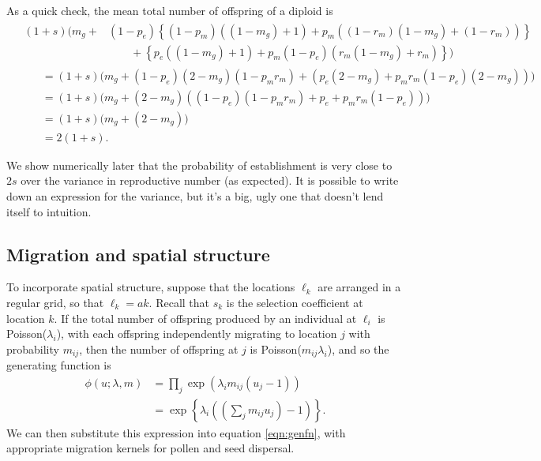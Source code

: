 As a quick check,
the mean total number of offspring of a diploid is
\begin{align}
  & \begin{aligned}
(1+s) \big(
    m_g
    + & (1-p_e)\left\{ (1-p_m) ( (1-m_g) + 1 ) + p_m ( (1-r_m)(1-m_g) + (1-r_m) ) \right\} \\
    & \qquad + \left\{ p_e ( (1-m_g) + 1 ) + p_m (1-p_e)( r_m(1-m_g) + r_m ) \right\} 
    \big) 
  \end{aligned}  \\
& \qquad = 
    (1+s) \big( m_g + 
      (1-p_e)(2-m_g)(1 - p_m r_m)
      + ( p_e (2-m_g) + p_m r_m (1-p_e)(2-m_g) )
    \big) \\
& \qquad = (1+s) \big( 
    m_g + (2-m_g) ( (1-p_e) (1 - p_m r_m) + p_e + p_m r_m(1-p_e) )
  \big) \\
& \qquad = (1+s) \big( 
    m_g + (2-m_g)
  \big) \\
& \qquad = 2(1+s) .
\end{align}

We show numerically later that the probability of establishment is very close to $2s$ over the variance in reproductive number (as expected).
It is possible to write down an expression for the variance, but it's a big, ugly one that doesn't lend itself to intuition.

\subsection*{Migration and spatial structure}

To incorporate spatial structure, suppose that the locations $\ell_k$ are arranged in a regular grid, so that $\ell_k = a k$. 
Recall that $s_k$ is the selection coefficient at location $k$.
If the total number of offspring produced by an individual at $\ell_i$ is Poisson($\lambda_i$), with each offspring independently migrating to location $j$
with probability $m_{ij}$,
then the number of offspring at $j$ is Poisson($m_{ij}\lambda_i$),
and so the generating function is
\begin{align}
  \phi(u;\lambda,m) &= \prod_j \exp( \lambda_i m_{ij} ( u_j - 1 ) ) \\
  &= \exp\left\{ \lambda_i \left(\left(\sum_j m_{ij} u_j\right) - 1\right) \right\} .
\end{align}
We can then substitute this expression into equation \eqref{eqn:genfn},
with appropriate migration kernels for pollen and seed dispersal.

